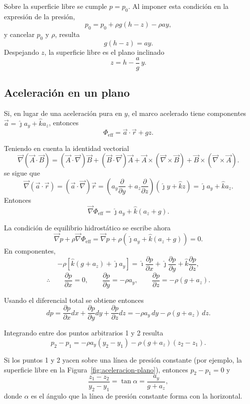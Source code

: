 Sobre la superficie libre se cumple $p=p_0$. Al imponer esta condición en la expresión de la presión,
$$
p_0=p_0+\rho g(h-z)-\rho ay,
$$
y cancelar $p_0$ y $\rho$, resulta
$$
g(h-z)=ay.
$$
Despejando $z$, la superficie libre es el plano inclinado
$$ z = h - \frac{a}{g}\,y. $$

\subsection{Aceleración en un plano}

Si, en lugar de una aceleración pura en $y$, el marco acelerado tiene componentes $\vec{a} = \hat{\jmath}a_y + \hat{k}a_z$, entonces
$$ \Phi_{\mathrm{eff}} = \vec{a}\cdot\vec{r} + gz. $$

Teniendo en cuenta la identidad vectorial
$$ \vec{\nabla}(\vec{A}\cdot\vec{B}) = (\vec{A}\cdot\vec{\nabla})\vec{B} + (\vec{B}\cdot\vec{\nabla})\vec{A} + \vec{A}\times(\vec{\nabla}\times\vec{B}) + \vec{B}\times(\vec{\nabla}\times\vec{A}). $$
se sigue que
$$ \vec{\nabla}(\vec{a}\cdot\vec{r}) = (\vec{a}\cdot\vec{\nabla})\vec{r} = \left(a_y\frac{\partial}{\partial y} + a_z\frac{\partial}{\partial z}\right)(\hat{\jmath}y + \hat{k}z) = \hat{\jmath}a_y + \hat{k}a_z. $$
Entonces
$$ \vec{\nabla}\Phi_{\mathrm{eff}} = \hat{\jmath}a_y + \hat{k}(a_z + g). $$

La condición de equilibrio hidrostático se escribe ahora
$$ \vec{\nabla}p + \rho\vec{\nabla}\Phi_{\mathrm{eff}} = \vec{\nabla}p + \rho\left(\hat{\jmath}a_y + \hat{k}(a_z + g)\right) = 0. $$
En componentes,
$$ -\rho\left[\hat{k}(g + a_z) + \hat{\jmath}a_y\right] = \hat{\imath}\frac{\partial p}{\partial x} + \hat{\jmath}\frac{\partial p}{\partial y} + \hat{k}\frac{\partial p}{\partial z}, $$
$$ \therefore \qquad \frac{\partial p}{\partial x} = 0, \qquad \frac{\partial p}{\partial y} = -\rho a_y, \qquad \frac{\partial p}{\partial z} = -\rho(g + a_z). $$

Usando el diferencial total se obtiene entonces
$$ dp = \frac{\partial p}{\partial x}dx + \frac{\partial p}{\partial y}dy + \frac{\partial p}{\partial z}dz = -\rho a_y\,dy - \rho(g + a_z)\,dz. $$

Integrando entre dos puntos arbitrarios 1 y 2 resulta
$$ p_2 - p_1 = -\rho a_y(y_2 - y_1) - \rho(g + a_z)(z_2 - z_1). $$

Si los puntos 1 y 2 yacen sobre una línea de presión constante (por ejemplo, la superficie libre en la Figura~\ref{fig:aceleracion-plano}), entonces $p_2 - p_1 = 0$ y
$$ \frac{z_1 - z_2}{y_2 - y_1} = \tan\alpha = \frac{a_y}{g + a_z}, $$
donde $\alpha$ es el ángulo que la línea de presión constante forma con la horizontal.

